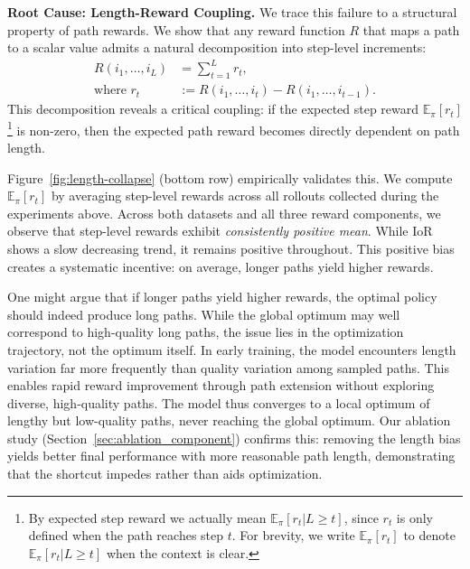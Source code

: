  
\textbf{Root Cause: Length-Reward Coupling.} We trace this failure to a structural property of path rewards. We show that any reward function $R$ that maps a path to a scalar value admits a natural decomposition into step-level increments:
\begin{equation}
\begin{split}
R(i_1, \ldots, i_L) &= \sum_{t=1}^{L} r_t, \\
\text{where } r_t &:= R(i_1, \ldots, i_t) - R(i_1, \ldots, i_{t-1}).
\end{split}
\label{eq:reward_decomposition}
\end{equation}
This decomposition reveals a critical coupling: if the expected step reward $\mathbb{E}_\pi[r_t]$
\footnote{By expected step reward we actually mean $\mathbb{E}_\pi[r_t | L \ge t]$, since $r_t$ is only defined when the path reaches step $t$. For brevity, we write $\mathbb{E}_\pi[r_t]$ to denote $\mathbb{E}_\pi[r_t | L \ge t]$ when the context is clear.}
is non-zero, then the expected path reward becomes directly dependent on path length.
 
Figure~\ref{fig:length-collapse} (bottom row) empirically validates this. We compute $\mathbb{E}_{\pi}[r_t]$ by averaging step-level rewards across all rollouts collected during the experiments above. Across both datasets and all three reward components, we observe that step-level rewards exhibit \emph{consistently positive mean}. While IoR shows a slow decreasing trend, it remains positive throughout. This positive bias creates a systematic incentive: on average, longer paths yield higher rewards.

One might argue that if longer paths yield higher rewards, the optimal policy should indeed produce long paths. While the global optimum may well correspond to high-quality long paths, the issue lies in the optimization trajectory, not the optimum itself. In early training, the model encounters length variation far more frequently than quality variation among sampled paths. This enables rapid reward improvement through path extension without exploring diverse, high-quality paths. The model thus converges to a local optimum of lengthy but low-quality paths, never reaching the global optimum. Our ablation study (Section~\ref{sec:ablation_component}) confirms this: removing the length bias yields better final performance with more reasonable path length, demonstrating that the shortcut impedes rather than aids optimization.
 
